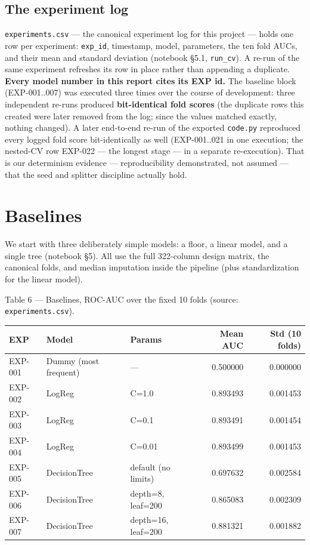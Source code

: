 \documentclass[11pt,a4paper]{article}
\begin{document}
{\subsection{The experiment log}\label{the-experiment-log}

\texttt{experiments.csv} --- the canonical experiment log for this project --- holds one row per experiment: \texttt{exp\_id}, timestamp, model, parameters, the ten fold AUCs, and their mean and standard deviation (notebook \S{}5.1, \texttt{run\_cv}). A re-run of the same experiment refreshes its row in place rather than appending a duplicate. \textbf{Every model number in this report cites its EXP id.} The baseline block (EXP-001..007) was executed three times over the course of development: three independent re-runs produced \textbf{bit-identical fold scores} (the duplicate rows this created were later removed from the log; since the values matched exactly, nothing changed). A later end-to-end re-run of the exported \texttt{code.py} reproduced every logged fold score bit-identically as well (EXP-001..021 in one execution; the nested-CV row EXP-022 --- the longest stage --- in a separate re-execution). That is our determinism evidence --- reproducibility demonstrated, not assumed --- that the seed and splitter discipline actually hold.

\section{Baselines}\label{baselines}

We start with three deliberately simple models: a floor, a linear model, and a single tree (notebook \S{}5). All use the full 322-column design matrix, the canonical folds, and median imputation inside the pipeline (plus standardization for the linear model).

Table 6 --- Baselines, ROC-AUC over the fixed 10 folds (source: \texttt{experiments.csv}).

{\def\LTcaptype{none} %

\begin{center}\small
\begin{tabular}{@{}lllrr@{}}
\toprule\noalign{}
EXP & Model & Params & Mean AUC & Std (10 folds) \\
\midrule\noalign{}
EXP-001 & Dummy (most frequent) & --- & 0.500000 & 0.000000 \\
EXP-002 & LogReg & C=1.0 & 0.893493 & 0.001453 \\
EXP-003 & LogReg & C=0.1 & 0.893491 & 0.001454 \\
EXP-004 & LogReg & C=0.01 & 0.893499 & 0.001453 \\
EXP-005 & DecisionTree & default (no limits) & 0.697632 & 0.002584 \\
EXP-006 & DecisionTree & depth=8, leaf=200 & 0.865083 & 0.002309 \\
EXP-007 & DecisionTree & depth=16, leaf=200 & 0.881321 & 0.001882 \\
\bottomrule
\end{tabular}
\end{center}

}}
\end{document}
